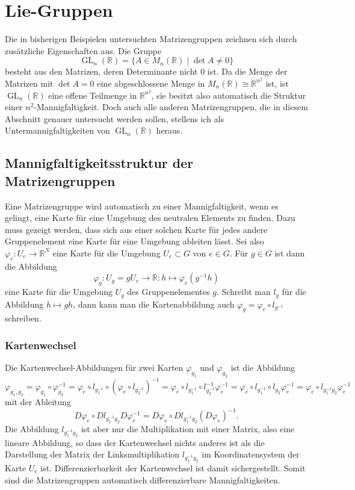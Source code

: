 %
%
%
\section{Lie-Gruppen
\label{buch:section:lie-gruppen}}
Die in bisherigen Beispielen untersuchten Matrizengruppen zeichnen sich
durch zusätzliche Eigenschaften aus.
Die Gruppe
\[
\operatorname{GL}_n(\mathbb{R}) 
=
\{ A \in M_n(\mathbb{R}) \mid \det A \ne 0\}
\]
besteht aus den Matrizen, deren Determinante nicht $0$ ist.
Da die Menge der Matrizen mit $\det A=0$ eine abgeschlossene Menge
in $M_n(\mathbb{R}) \cong \mathbb{R}^{n^2}$ ist, ist
$\operatorname{GL}_n(\mathbb{R})$ eine offene Teilmenge in $\mathbb{R}^{n^2}$,
sie besitzt also automatisch die Struktur einer $n^2$-Mannigfaltigkeit.
Doch auch alle anderen Matrizengruppen,
die in diesem Abschnitt genauer untersucht werden sollen,
stellens ich als Untermannigfaltigkeiten von
$\operatorname{GL}_n(\mathbb{R})$ heraus.

\subsection{Mannigfaltigkeitsstruktur der Matrizengruppen
\label{buch:subsection:mannigfaltigkeitsstruktur-der-matrizengruppen}}
Eine Matrizengruppe wird automatisch zu einer Mannigfaltigkeit,
wenn es gelingt, eine Karte für eine Umgebung des neutralen Elements
zu finden.
Dazu muss gezeigt werden, dass sich aus einer solchen Karte für jedes
andere Gruppenelement eine Karte für eine Umgebung ableiten lässt.
Sei also $\varphi_e\colon U_e \to \mathbb{R}^N$ eine Karte für die Umgebung
$U_e\subset G$ von $e\in G$.
Für $g\in G$ ist dann die Abbildung
\[
\varphi_g
\colon
U_g
=
gU_e
\to
\mathbb{R}
:
h\mapsto \varphi_e(g^{-1}h)
\]
eine Karte für die Umgebung $U_g$ des Gruppenelementes $g$.
Schreibt man $l_{g}$ für  die Abbildung $h\mapsto gh$, dann
kann man die Kartenabbildung auch $\varphi_g = \varphi_e\circ l_{g^{-1}}$
schreiben.

\subsubsection{Kartenwechsel}
Die Kartenwechsel-Abbildungen für zwei Karten $\varphi_{g_1}$
und $\varphi_{g_2}$ ist die Abbildung
\[
\varphi_{g_1,g_2}
=
\varphi_{g_1}\circ \varphi_{g_2}^{-1}
=
\varphi_e\circ l_{g_1^{-1}} \circ (\varphi_e\circ l_{g_2^{-1}})^{-1}
=
\varphi_e\circ l_{g_1^{-1}} \circ l_{g_2^{-1}}^{-1} \varphi_e^{-1}
=
\varphi_e\circ l_{g_1^{-1}} \circ l_{g_2}\varphi_e^{-1}
=
\varphi_e\circ l_{g_1^{-1}g_2}\varphi_e^{-1}
\]
mit der Ableitung
\[
D\varphi_e\circ Dl_{g_1^{-1}g_2} D\varphi_e^{-1}
=
D\varphi_e\circ Dl_{g_1^{-1}g_2} (D\varphi_e)^{-1}.
\]
Die Abbildung $l_{g_1^{-1}g_2}$ ist aber nur die Multiplikation mit
einer Matrix, also eine lineare Abbildung, so dass der Kartenwechsel
nichts anderes ist als die Darstellung der Matrix der Linksmultiplikation
$l_{g_1^{-1}g_2}$ im Koordinatensystem der Karte $U_e$ ist.
Differenzierbarkeit der Kartenwechsel ist damit sichergestellt.
Somit sind
die Matrizengruppen automatisch differenzierbare Mannigfaltigkeiten.

